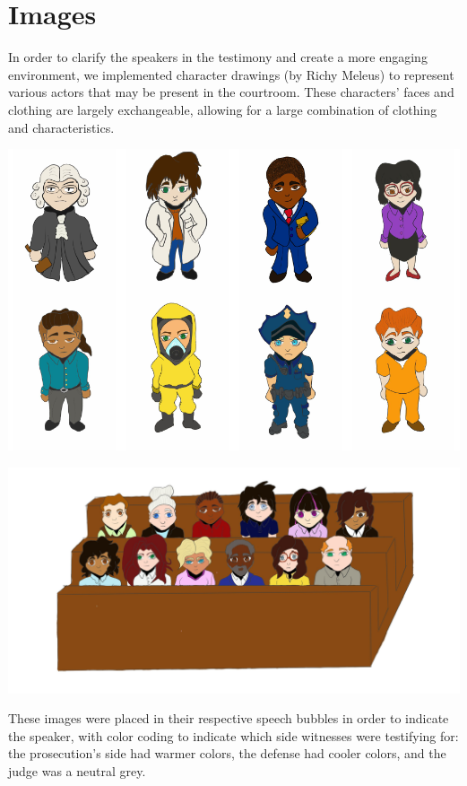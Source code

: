 \documentclass[print]{nuthesis}
\begin{document}
\hypertarget{images}{%
\section{Images}\label{images}}

In order to clarify the speakers in the testimony and create a more engaging environment, we implemented character drawings (by Richy Meleus) to represent various actors that may be present in the courtroom. These characters' faces and clothing are largely exchangeable, allowing for a large combination of clothing and characteristics.

\includegraphics[width=\linewidth]{thesis_files/figure-latex/demo_evidence-1}

\includegraphics[width=\linewidth]{images/Jury}

These images were placed in their respective speech bubbles in order to indicate the speaker, with color coding to indicate which side witnesses were testifying for: the prosecution's side had warmer colors, the defense had cooler colors, and the judge was a neutral grey.
\end{document}
